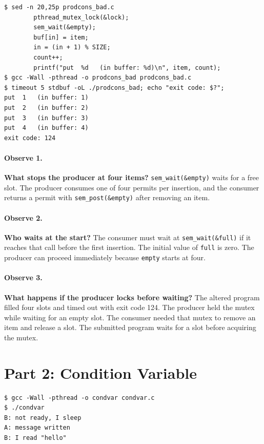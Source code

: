 \documentclass[12pt,a4paper]{article}
\begin{document}
\begin{lstlisting}[caption={The altered producer blocks with the buffer full}]
$ sed -n 20,25p prodcons_bad.c
        pthread_mutex_lock(&lock);
        sem_wait(&empty);
        buf[in] = item;
        in = (in + 1) % SIZE;
        count++;
        printf("put  %d   (in buffer: %d)\n", item, count);
$ gcc -Wall -pthread -o prodcons_bad prodcons_bad.c
$ timeout 5 stdbuf -oL ./prodcons_bad; echo "exit code: $?";
put  1   (in buffer: 1)
put  2   (in buffer: 2)
put  3   (in buffer: 3)
put  4   (in buffer: 4)
exit code: 124
\end{lstlisting}

\paragraph{Observe 1.} \textbf{What stops the producer at four items?} \texttt{sem\_wait(\&empty)} waits for a free slot. The producer consumes one of four permits per insertion, and the consumer returns a permit with \texttt{sem\_post(\&empty)} after removing an item.

\paragraph{Observe 2.} \textbf{Who waits at the start?} The consumer must wait at \texttt{sem\_wait(\&full)} if it reaches that call before the first insertion. The initial value of \texttt{full} is zero. The producer can proceed immediately because \texttt{empty} starts at four.

\paragraph{Observe 3.} \textbf{What happens if the producer locks before waiting?} The altered program filled four slots and timed out with exit code 124. The producer held the mutex while waiting for an empty slot. The consumer needed that mutex to remove an item and release a slot. The submitted program waits for a slot before acquiring the mutex.

\section{Part 2: Condition Variable}

\begin{lstlisting}[caption={Predicate checked in a loop}]
$ gcc -Wall -pthread -o condvar condvar.c
$ ./condvar
B: not ready, I sleep
A: message written
B: I read "hello"
\end{lstlisting}
\end{document}
